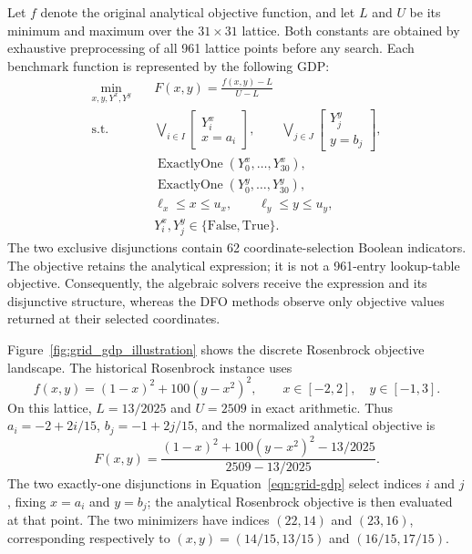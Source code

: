 \documentclass{article}
\begin{document}
Let \(f\) denote the original analytical objective function, and let \(L\) and \(U\) be its minimum and maximum over the \(31\times31\) lattice.
Both constants are obtained by exhaustive preprocessing of all 961 lattice points before any search.
Each benchmark function is represented by the following GDP:
\begin{equation}\label{eqn:grid-gdp}
\begin{aligned}
\min_{x,y,Y^x,Y^y}\quad & F(x,y)=\frac{f(x,y)-L}{U-L}\\
\mathrm{s.t.}\quad &
\bigvee_{i\in I}\left[\begin{array}{c}Y_i^x\\x=a_i\end{array}\right],\qquad
\bigvee_{j\in J}\left[\begin{array}{c}Y_j^y\\y=b_j\end{array}\right],\\
&\operatorname{ExactlyOne}(Y_0^x,\ldots,Y_{30}^x),\\
&\operatorname{ExactlyOne}(Y_0^y,\ldots,Y_{30}^y),\\
&\ell_x\leq x\leq u_x,\qquad \ell_y\leq y\leq u_y,\\
&Y_i^x,Y_j^y\in\{\mathrm{False},\mathrm{True}\}.
\end{aligned}
\end{equation}
The two exclusive disjunctions contain 62 coordinate-selection Boolean indicators.
The objective retains the analytical expression; it is not a 961-entry lookup-table objective.
Consequently, the algebraic solvers receive the expression and its disjunctive structure, whereas the DFO methods observe only objective values returned at their selected coordinates.

Figure~\ref{fig:grid_gdp_illustration} shows the discrete Rosenbrock objective landscape.
The historical Rosenbrock instance uses
\begin{equation}\label{eqn:grid-rosenbrock}
f(x,y)=(1-x)^2+100(y-x^2)^2,\qquad
x\in[-2,2],\quad y\in[-1,3].
\end{equation}
On this lattice, $L=13/2025$ and \(U=2509\) in exact arithmetic.
Thus \(a_i=-2+2i/15\), \(b_j=-1+2j/15\), and the normalized analytical objective is
\begin{equation}\label{eqn:grid-rosenbrock-normalized}
F(x,y)=\frac{(1-x)^2+100(y-x^2)^2-13/2025}{2509-13/2025}.
\end{equation}
The two exactly-one disjunctions in Equation~\eqref{eqn:grid-gdp} select indices \(i\) and \(j\), fixing \(x=a_i\) and \(y=b_j\); the analytical Rosenbrock objective is then evaluated at that point.
The two minimizers have indices \((22,14)\) and \((23,16)\), corresponding respectively to \((x,y)=(14/15,13/15)\) and \((16/15,17/15)\).
\end{document}
